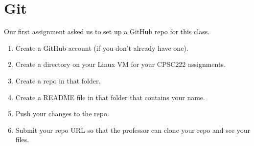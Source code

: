 \documentclass{article}
\begin{document}




\newpage

\setcounter{section}{-1}


\section{Git}

Our first assignment asked us to set up a GitHub repo for this class.

\begin{enumerate}

	\item Create a GitHub account (if you don't already have one).

	\item Create a directory on your Linux VM for your CPSC222 assignments.

	\item Create a repo in that folder.

	\item Create a README file in that folder that contains your name.

	\item Push your changes to the repo.

	\item

		Submit your repo URL so that the professor can clone your repo
		and see your files.

\end{enumerate}
\end{document}
